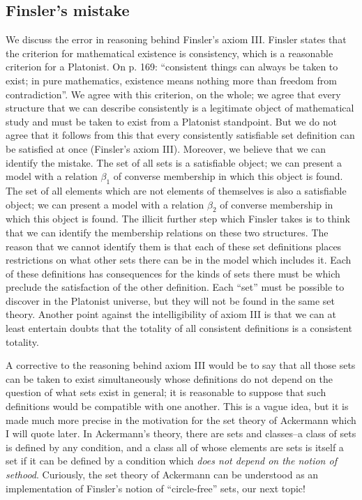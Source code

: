 \subsection{Finsler's mistake}

We discuss the error in reasoning behind Finsler's axiom III.  Finsler
states that the criterion for mathematical existence is consistency,
which is a reasonable criterion for a Platonist.  On p. 169:
``consistent things can always be taken to exist; in pure mathematics,
existence means nothing more than freedom from contradiction''.  We
agree with this criterion, on the whole; we agree that every structure
that we can describe consistently is a legitimate object of
mathematical study and must be taken to exist from a Platonist
standpoint.  But we do not agree that it follows from this that every
consistently satisfiable set definition can be satisfied at once
(Finsler's axiom III).  Moreover, we believe that we can identify the
mistake.  The set of all sets is a satisfiable object; we can present
a model with a relation $\beta_1$ of converse membership in which this
object is found.  The set of all elements which are not elements of
themselves is also a satisfiable object; we can present a model with a
relation $\beta_2$ of converse membership in which this object is
found.  The illicit further step which Finsler takes is to think that
we can identify the membership relations on these two structures.  The
reason that we cannot identify them is that each of these set
definitions places restrictions on what other sets there can be in the
model which includes it.  Each of these definitions has consequences
for the kinds of sets there must be which preclude the satisfaction of
the other definition.  Each ``set'' must be possible to discover in
the Platonist universe, but they will not be found in the same set
theory.  Another point against the intelligibility of axiom III is
that we can at least entertain doubts that the totality of all
consistent definitions is a consistent totality.  

A corrective to the reasoning behind axiom III would be to say that
all those sets can be taken to exist simultaneously whose definitions
do not depend on the question of what sets exist in general; it is
reasonable to suppose that such definitions would be compatible with
one another.  This is a vague idea, but it is made much more precise
in the motivation for the set theory of Ackermann which I will quote
later. In Ackermann's theory, there are sets and classes--a class of
sets is defined by any condition, and a class all of whose elements
are sets is itself a set if it can be defined by a condition which
{\em does not depend on the notion of sethood\/}.  Curiously, the set
theory of Ackermann can be understood as an implementation of
Finsler's notion of ``circle-free'' sets, our next topic!

